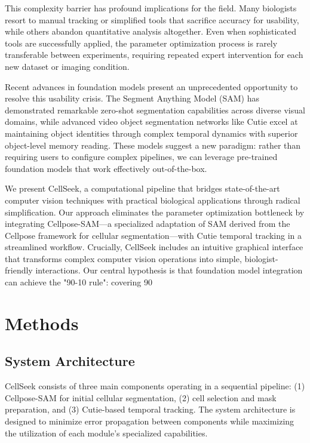 \documentclass[12pt]{article}
\begin{document}
This complexity barrier has profound implications for the field. Many biologists resort to manual tracking or simplified tools that sacrifice accuracy for usability, while others abandon quantitative analysis altogether. Even when sophisticated tools are successfully applied, the parameter optimization process is rarely transferable between experiments, requiring repeated expert intervention for each new dataset or imaging condition.

Recent advances in foundation models present an unprecedented opportunity to resolve this usability crisis. The Segment Anything Model (SAM) has demonstrated remarkable zero-shot segmentation capabilities across diverse visual domains, while advanced video object segmentation networks like Cutie excel at maintaining object identities through complex temporal dynamics with superior object-level memory reading. These models suggest a new paradigm: rather than requiring users to configure complex pipelines, we can leverage pre-trained foundation models that work effectively out-of-the-box.

We present CellSeek, a computational pipeline that bridges state-of-the-art computer vision techniques with practical biological applications through radical simplification. Our approach eliminates the parameter optimization bottleneck by integrating Cellpose-SAM—a specialized adaptation of SAM derived from the Cellpose framework for cellular segmentation—with Cutie temporal tracking in a streamlined workflow. Crucially, CellSeek includes an intuitive graphical interface that transforms complex computer vision operations into simple, biologist-friendly interactions. Our central hypothesis is that foundation model integration can achieve the "90-10 rule": covering 90%

\section{Methods}

\subsection{System Architecture}


CellSeek consists of three main components operating in a sequential pipeline: (1) Cellpose-SAM for initial cellular segmentation, (2) cell selection and mask preparation, and (3) Cutie-based temporal tracking. The system architecture is designed to minimize error propagation between components while maximizing the utilization of each module's specialized capabilities.
\end{document}
